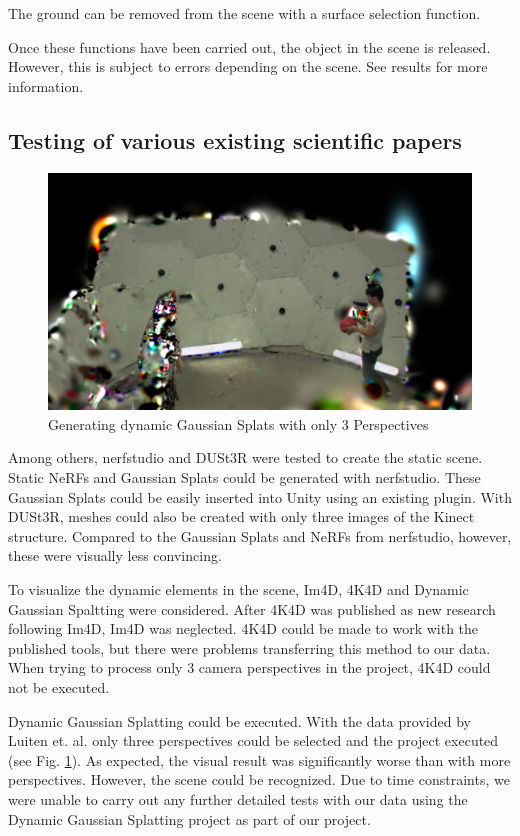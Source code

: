 \documentclass[conference]{IEEEtran}
\begin{document}
The ground can be removed from the scene with a surface selection function.

Once these functions have been carried out, the object in the scene is released. However, this is subject to errors depending on the scene. See results for more information.

\subsection{Testing of various existing scientific papers}

\begin{figure}[h]
    \centering
    \includegraphics[width=1.0\linewidth]{Pictures/dgs_3Cams.jpg}
    \caption{Generating dynamic Gaussian Splats with only 3 Perspectives}
    \label{dgs_3cams}
\end{figure}

Among others, nerfstudio \cite{b6} and DUSt3R \cite{b7} were tested to create the static scene. Static NeRFs and Gaussian Splats could be generated with nerfstudio. These Gaussian Splats could be easily inserted into Unity using an existing plugin.
With DUSt3R, meshes could also be created with only three images of the Kinect structure. Compared to the Gaussian Splats and NeRFs from nerfstudio, however, these were visually less convincing.

To visualize the dynamic elements in the scene, Im4D, 4K4D and Dynamic Gaussian Spaltting were considered. After 4K4D was published as new research following Im4D, Im4D was neglected.
4K4D could be made to work with the published tools, but there were problems transferring this method to our data. When trying to process only 3 camera perspectives in the project, 4K4D could not be executed.

Dynamic Gaussian Splatting could be executed. With the data provided by Luiten et. al. only three perspectives could be selected and the project executed (see Fig. \ref{dgs_3cams}). As expected, the visual result was significantly worse than with more perspectives. However, the scene could be recognized. Due to time constraints, we were unable to carry out any further detailed tests with our data using the Dynamic Gaussian Splatting project as part of our project.
\end{document}
